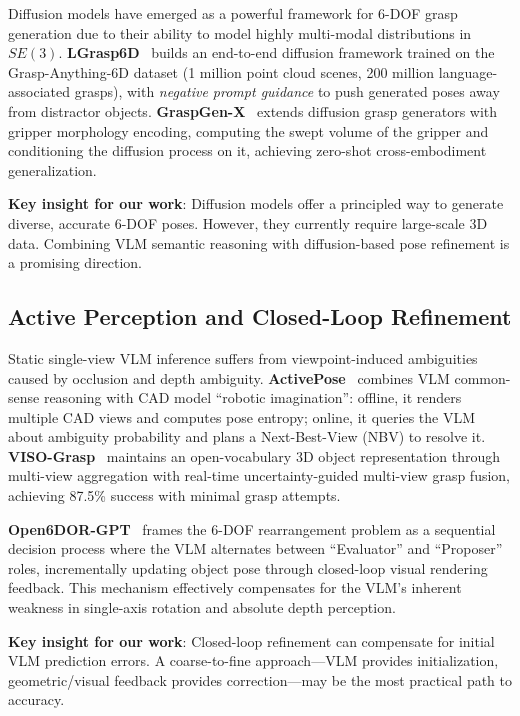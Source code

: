 \documentclass[11pt,a4paper]{article}
\begin{document}
Diffusion models have emerged as a powerful framework for 6-DOF grasp generation due to their ability to model highly multi-modal distributions in $SE(3)$. \textbf{LGrasp6D}~\cite{lgrasp6d} builds an end-to-end diffusion framework trained on the Grasp-Anything-6D dataset (1 million point cloud scenes, 200 million language-associated grasps), with \textit{negative prompt guidance} to push generated poses away from distractor objects. \textbf{GraspGen-X}~\cite{graspgenx} extends diffusion grasp generators with gripper morphology encoding, computing the swept volume of the gripper and conditioning the diffusion process on it, achieving zero-shot cross-embodiment generalization.

\textbf{Key insight for our work}: Diffusion models offer a principled way to generate diverse, accurate 6-DOF poses. However, they currently require large-scale 3D data. Combining VLM semantic reasoning with diffusion-based pose refinement is a promising direction.

\subsection{Active Perception and Closed-Loop Refinement}

Static single-view VLM inference suffers from viewpoint-induced ambiguities caused by occlusion and depth ambiguity. \textbf{ActivePose}~\cite{activepose} combines VLM common-sense reasoning with CAD model ``robotic imagination'': offline, it renders multiple CAD views and computes pose entropy; online, it queries the VLM about ambiguity probability and plans a Next-Best-View (NBV) to resolve it. \textbf{VISO-Grasp}~\cite{visograsp} maintains an open-vocabulary 3D object representation through multi-view aggregation with real-time uncertainty-guided multi-view grasp fusion, achieving 87.5\% success with minimal grasp attempts.

\textbf{Open6DOR-GPT}~\cite{open6dor} frames the 6-DOF rearrangement problem as a sequential decision process where the VLM alternates between ``Evaluator'' and ``Proposer'' roles, incrementally updating object pose through closed-loop visual rendering feedback. This mechanism effectively compensates for the VLM's inherent weakness in single-axis rotation and absolute depth perception.

\textbf{Key insight for our work}: Closed-loop refinement can compensate for initial VLM prediction errors. A coarse-to-fine approach---VLM provides initialization, geometric/visual feedback provides correction---may be the most practical path to accuracy.
\end{document}
